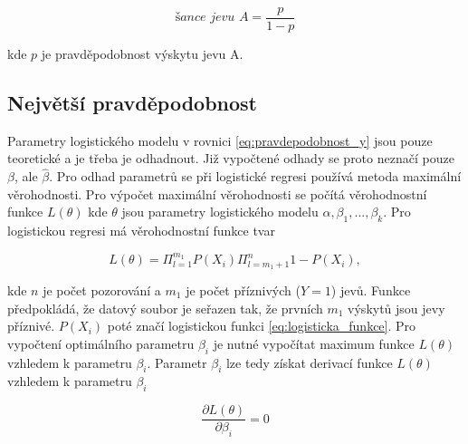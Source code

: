 \begin{equation}
    \label{eq:logitova_funkce}
    \textit{šance jevu A} = \frac{p}{1 - p}
\end{equation}

kde $p$ je pravděpodobnost výskytu jevu A.

\subsection{Největší pravděpodobnost}
Parametry logistického modelu v rovnici \ref{eq:pravdepodobnost_y} jsou pouze teoretické a je třeba je odhadnout. Již vypočtené odhady
se proto neznačí pouze $\beta$, ale $\hat{\beta}$. Pro odhad parametrů se při logistické regresi používá metoda maximální věrohodnosti. Pro výpočet
maximální věrohodnosti se počítá věrohodnostní funkce $L(\theta)$ kde $\theta$ jsou parametry logistického modelu $\alpha, \beta_1, ..., \beta_k$.
Pro logistickou regresi má věrohodnostní funkce tvar

\begin{equation}
    \label{eq:pravdepodobnostni_fce}
    L(\theta) = \Pi_{l = 1}^{m_1} P(X_i) \Pi_{l = m_1 + 1}^{n} 1 - P(X_i),
\end{equation}

kde $n$ je počet pozorování a $m_1$ je počet příznivých ($Y = 1$) jevů. Funkce předpokládá, že datový soubor je seřazen tak, že prvních $m_1$ výskytů
jsou jevy příznivé. $P(X_i)$ poté značí logistickou funkci \ref{eq:logisticka_funkce}. Pro vypočtení optimálního parametru $\beta_i$ je nutné vypočítat
maximum funkce $L(\theta)$ vzhledem k parametru $\beta_i$. Parametr $\beta_i$ lze tedy získat derivací funkce $L(\theta)$ vzhledem k parametru $\beta_i$

\begin{equation}
    \frac{\partial L(\theta)}{\partial \beta_i} = 0
\end{equation}

